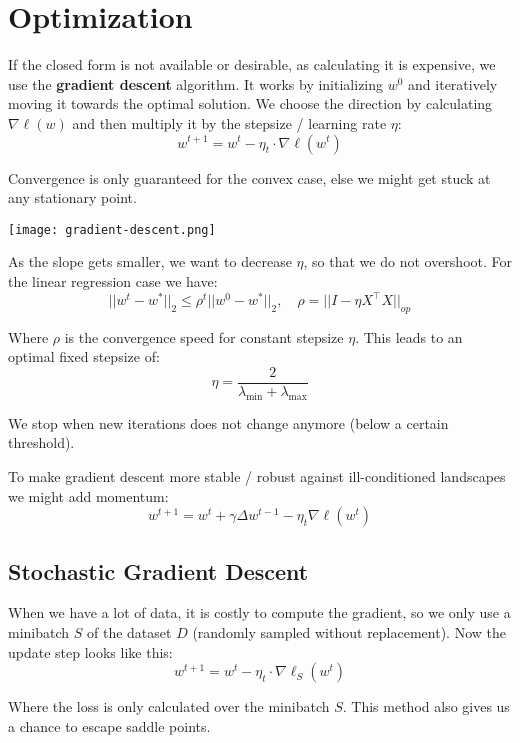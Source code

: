 \section{Optimization}

If the closed form is not available or desirable, as calculating it is expensive, we use the \textbf{gradient descent} algorithm. It works by initializing $w^0$ and iteratively moving it towards the optimal solution. We choose the direction by calculating $\nabla \ell(w)$ and then multiply it by the stepsize / learning rate $\eta$:
$$w^{t+1} = w^t - \eta_t \cdot \nabla \ell(w^t)$$

Convergence is only guaranteed for the convex case, else we might get stuck at any stationary point. 

\begin{center}
	\texttt{[image: gradient-descent.png]}
\end{center}

As the slope gets smaller, we want to decrease $\eta$, so that we do not overshoot. For the linear regression case we have:
$$||w^t - w^*||_2 \leq \rho^t ||w^0 - w^*||_2, \quad \rho = ||I - \eta X^\top X||_{op}$$

Where $\rho$ is the convergence speed for constant stepsize $\eta$. This leads to an optimal fixed stepsize of:
$$\eta = \frac{2}{\lambda_{\text{min}} + \lambda_{\text{max}}}$$

We stop when new iterations does not change anymore (below a certain threshold).

To make gradient descent more stable / robust against ill-conditioned landscapes we might add momentum:
$$w^{t+1} = w^t + \gamma \Delta w^{t-1} - \eta_t \nabla \ell(w^t)$$

\subsection{Stochastic Gradient Descent}

When we have a lot of data, it is costly to compute the gradient, so we only use a minibatch $S$ of the dataset $D$ (randomly sampled without replacement). Now the update step looks like this:
$$w^{t+1} = w^t - \eta_t \cdot \nabla \ell_S(w^t)$$

Where the loss is only calculated over the minibatch $S$. This method also gives us a chance to escape saddle points.